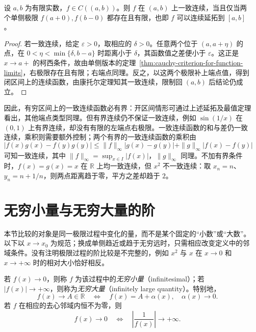 \begin{proposition}[有穷开区间上的一致连续性]
\label{prop:uniform-continuity-and-endpoint-extension}
设 $a,b$ 为有限实数，$f\in C((a,b))$。则 $f$ 在 $(a,b)$ 上一致连续，当且仅当两个单侧极限 $f(a+0),f(b-0)$ 都存在且有限，也即 $f$ 可以连续延拓到 $[a,b]$。
\end{proposition}

\begin{proof}
若一致连续，给定 $\varepsilon>0$，取相应的 $\delta>0$。任意两个位于 $(a,a+\eta)$ 的点，在 $0<\eta<\min\{\delta,b-a\}$ 时距离小于 $\delta$，其函数值之差便小于 $\varepsilon$。这正是 $x\to a+$ 的柯西条件，故由单侧版本的定理~\ref{thm:cauchy-criterion-for-function-limits}，右极限存在且有限；右端点同理。反之，以这两个极限补上端点值，得到闭区间上的连续函数，由康托尔定理知其一致连续，限制回 $(a,b)$ 后结论仍成立。
\end{proof}

因此，有穷区间上的一致连续函数必有界：开区间情形可通过上述延拓及最值定理看出，其他端点类型同理。但有界连续仍不保证一致连续，例如 $\sin(1/x)$ 在 $(0,1)$ 上有界连续，却没有有限的左端点右极限。一致连续函数的和与差仍一致连续，乘积则需要额外控制；两个有界的一致连续函数的乘积由
\[
    |f(x)g(x)-f(y)g(y)|
    \leq\|f\|_\infty|g(x)-g(y)|+\|g\|_\infty|f(x)-f(y)|
\]
可知一致连续，其中 $\|f\|_\infty=\sup_{x\in I}|f(x)|$，$\|g\|_\infty$ 同理。不加有界条件时，$f(x)=g(x)=x$ 在 $\mathbb{R}$ 上均一致连续，但 $x^2$ 不一致连续：取 $x_n=n$、$y_n=n+1/n$，则两点距离趋于零，平方之差却趋于 $2$。

\section{无穷小量与无穷大量的阶}
\label{sec:orders-of-infinitesimals-and-infinities}

本节比较的对象是同一极限过程中变化的量，而不是某个固定的“小数”或“大数”。以下以 $x\to x_0$ 为规范；换成单侧趋近或趋于无穷远时，只需相应改变定义中的邻域条件。没有注明极限过程的阶比较是不完整的，例如 $x^2$ 与 $x$ 在 $x\to0$ 和 $x\to+\infty$ 时的相对大小恰好相反。

\begin{definition}
\label{def:infinitesimal-and-infinite-functions}
若 $f(x)\to0$，则称 $f$ 为该过程中的\emph{无穷小量}（infinitesimal）；若 $|f(x)|\to+\infty$，则称为\emph{无穷大量}（infinitely large quantity）。特别地，
\[
    f(x)\to A\in\mathbb{R}
    \quad\Longleftrightarrow\quad f(x)=A+\alpha(x),\quad\alpha(x)\to0.
\]
若 $f$ 在相应的去心邻域内恒不为零，则
\begin{equation}
    f(x)\to0
    \quad\Longleftrightarrow\quad
    \left|\frac1{f(x)}\right|\to+\infty.
    \label{eq:infinitesimal-and-reciprocal-infinity}
\end{equation}
\end{definition}

